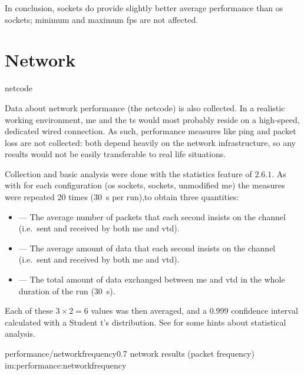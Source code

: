 In conclusion,  sockets do provide slightly better average performance than \gls{os} sockets; minimum and maximum \gls{fps} are not affected.

\section{Network}\label{sc:performance:network}

\begin{definition}{netcode}
\end{definition}



Data about network performance (the \gls{netcode}) is also collected. In a realistic working environment, \gls{me} and the \gls{ts} would most probably reside on a high-speed, dedicated wired connection. As such, performance measures like ping and packet loss are not collected: both depend heavily on the network infrastructure, so any results would not be easily transferable to real life situations.

Collection and basic analysis were done with the statistics feature of  $2.6.1$. As with  for each configuration (\gls{os} sockets,  sockets, unmodified \gls{me}) the measures were repeated \num{20} times (\SI{30}{\second} per run),to obtain three quantities:

\begin{itemize}
	\item {} --- The average number of packets that each second insists on the channel (i.e.\ sent and received by both \gls{me} and \gls{vtd}).
	\item {} --- The average amount of data that each second insists on the channel (i.e.\ sent and received by both \gls{me} and \gls{vtd}).
	\item {} --- The total amount of data exchanged between \gls{me} and \gls{vtd} in the whole duration of the run (\SI{30}{\second}).
\end{itemize}

\FLOATnoindent Each of these $3\times2=6$ values was then averaged, and a \num{0,999} confidence interval calculated with a Student t's distribution. See  for some hints about statistical analysis.

\begin{image}
	{performance/networkfrequency}{0.7}
	{network results (packet frequency)}
	{im:performance:networkfrequency}
	{}
\end{image}

